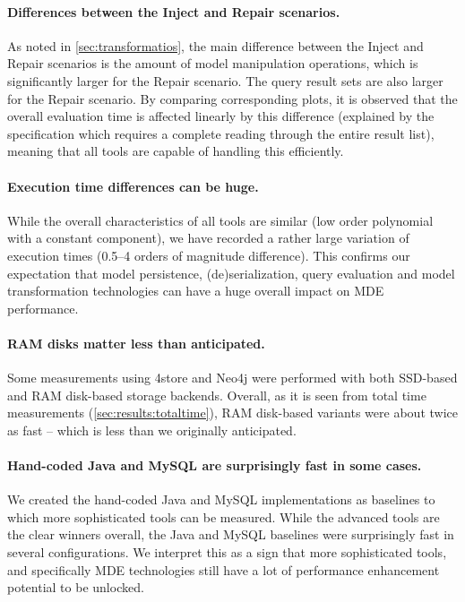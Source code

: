 \paragraph{Differences between the Inject and Repair scenarios.}
As noted in \autoref{sec:transformatios}, the main difference between the \textsf{Inject} and \textsf{Repair} scenarios is the amount of model manipulation operations, which is significantly larger for the \textsf{Repair} scenario. The query result sets are also larger for the \textsf{Repair} scenario. By comparing corresponding plots, it is observed that the overall evaluation time is affected linearly by this difference (explained by the specification which requires a complete reading through the entire result list), meaning that all tools are capable of handling this efficiently.

\paragraph{Execution time differences can be huge.}
While the overall characteristics of all tools are similar (low order polynomial with a constant component), we have recorded a rather large variation of execution times (0.5--4 orders of magnitude difference). This confirms our expectation that model persistence, (de)serialization, query evaluation and model transformation technologies can have a huge overall impact on MDE performance. 

\paragraph{RAM disks matter less than anticipated.}
Some measurements using 4store and Neo4j were performed with both SSD-based and RAM disk-based storage backends. Overall, as it is seen from total time measurements (\autoref{sec:results:totaltime}), RAM disk-based variants were about twice as fast -- which is less than we originally anticipated.

\paragraph{Hand-coded Java and MySQL are surprisingly fast in some cases.}
We created the hand-coded Java and MySQL implementations as baselines to which more sophisticated tools can be measured. While the advanced tools are the clear winners overall, the Java and MySQL baselines were surprisingly fast in several configurations. We interpret this as a sign that more sophisticated tools, and specifically MDE technologies still have a lot of performance enhancement potential to be unlocked.

